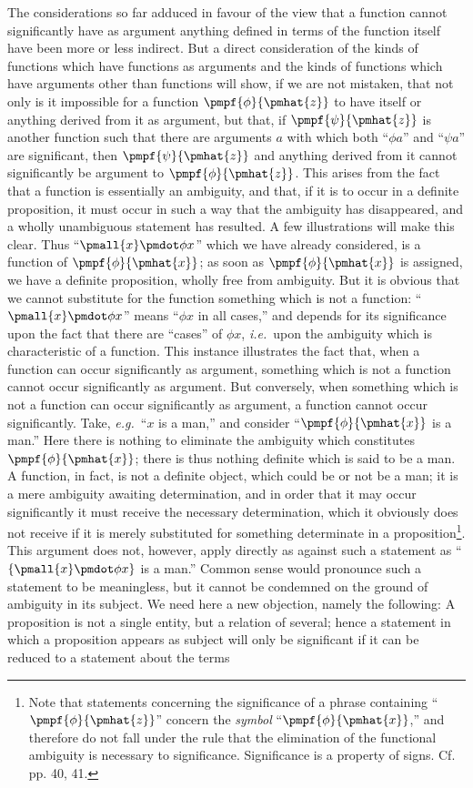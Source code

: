 \documentclass[letterpaper,12pt,openany,leqno]{book}
\newcommand{\pagefirst}[1]{\marginnote[\boxed{\text{#1}}]{\boxed{\text{#1}}}}
\begin{document}
The considerations so far adduced in favour of the view that a function cannot significantly have as argument anything defined in terms of the function itself have been more or less indirect. But a direct consideration of the kinds of functions which have functions as arguments and the kinds of functions which have arguments other than functions will show, if we are not mistaken, that not only is it impossible for a function $\pmpf{\phi}{\pmhat{z}}$ to have itself or anything derived from it as argument, but that, if $\pmpf{\psi}{\pmhat{z}}$ is another function such that there are arguments $a$ with which both ``$\phi a$'' and ``$\psi a$'' are significant, then $\pmpf{\psi}{\pmhat{z}}$ and anything derived from it cannot significantly be argument to $\pmpf{\phi}{\pmhat{z}}$. This arises from the fact that a function is essentially an ambiguity, and that, if it is to occur in a definite proposition, it must occur in such a way that the ambiguity has disappeared, and a wholly unambiguous statement has resulted. A few illustrations will make this clear. Thus ``$\pmall{x}\pmdot\phi x$'' which we have already considered, is a function of $\pmpf{\phi}{\pmhat{x}}$; as soon as $\pmpf{\phi}{\pmhat{x}}$ is assigned, we have a definite proposition, wholly free from ambiguity. But it is obvious that we cannot substitute for the function something which is not a function: ``$\pmall{x}\pmdot\phi x$'' means ``$\phi x$ in all cases,'' and depends for its significance upon the fact that there are ``cases'' of $\phi x$, \textit{i.e.}\ upon the ambiguity which is characteristic of a function. This instance illustrates the fact that, when a function can occur significantly as argument, something which is not a function cannot occur significantly as argument. But conversely, when something which is not a function can occur significantly as argument, a function cannot occur significantly. Take, \textit{e.g.}\ ``$x$ is a man,'' and consider ``$\pmpf{\phi}{\pmhat{x}}$ is a man.'' Here there is nothing to eliminate the ambiguity which constitutes $\pmpf{\phi}{\pmhat{x}}$; there is thus nothing definite which is said to be a man. A function, in fact, is not a definite object, which could be or not be a man; it is a mere ambiguity awaiting determination, and in order that it may occur significantly it must receive the necessary determination, which it obviously does not receive if it is merely substituted for something determinate in a proposition\footnote{Note that statements concerning the significance of a phrase containing ``$\pmpf{\phi}{\pmhat{z}}$'' concern the \textit{symbol} ``$\pmpf{\phi}{\pmhat{x}}$,'' and therefore do not fall under the rule that the elimination of the functional ambiguity is necessary to significance. Significance is a property of signs. Cf. pp. 40, 41.}. This argument does not, however, apply directly as against such a statement as ``$\{\pmall{x}\pmdot\phi x\}$ is a man.'' Common sense would pronounce such a statement to be meaningless, but it cannot be condemned on the ground of ambiguity in its subject. We need \pagefirst{51} here a new objection, namely the following: A proposition is not a single entity, but a relation of several; hence a statement in which a proposition appears as subject will only be significant if it can be reduced to a statement about the terms 
\end{document}
